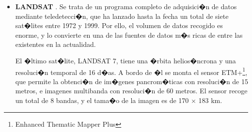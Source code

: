 \begin{itemize}
	\item \textbf{LANDSAT} \cite{webLandsat}. Se trata de un programa completo de adquisici�n de datos mediante teledetecci�n, que ha lanzado hasta la fecha un total de siete sat�lites entre 1972 y 1999. Por ello, el volumen de datos recogido es enorme, y lo convierte en una de las fuentes de datos m�s ricas  de entre las existentes en la actualidad. 

	El �ltimo sat�lite, LANDSAT 7, tiene una �rbita helios�ncrona y una resoluci�n temporal de 16 d�as. A bordo de �l se monta el sensor ETM+\footnote{Enhanced Thematic Mapper Plus}, que permite la obtenci�n de im�genes pancrom�ticas con resoluci�n de 15 metros, e imagenes multibanda con resoluci�n de 60 metros. El sensor recoge un total de 8 bandas, y el tama�o de la imagen es de 170 $\times$ 183 km.


\end{itemize}

